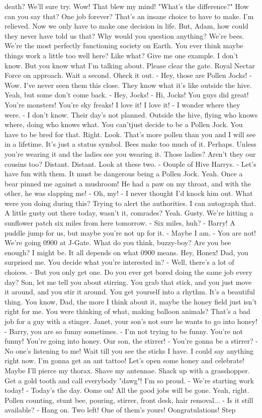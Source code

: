 \documentclass{article}
\begin{document}
death? We'll sure try. Wow! That blew my mind! "What's the difference?" How can you say that? One job forever? That's an insane choice to have to make. I'm relieved. Now we only have to make one decision in life. But, Adam, how could they never have told us that? Why would you question anything? We're bees. We're the most perfectly functioning society on Earth. You ever think maybe things work a little too well here? Like what? Give me one example. I don't know. But you know what I'm talking about. Please clear the gate. Royal Nectar Force on approach. Wait a second. Oheck it out. - Hey, those are Pollen Jocks! - Wow. I've never seen them this close. They know what it's like outside the hive. Yeah, but some don't come back. - Hey, Jocks! - Hi, Jocks! You guys did great! You're monsters! You're sky freaks! I love it! I love it! - I wonder where they were. - I don't know. Their day's not planned. Outside the hive, flying who knows where, doing who knows what. You can'tjust decide to be a Pollen Jock. You have to be bred for that. Right. Look. That's more pollen than you and I will see in a lifetime. It's just a status symbol. Bees make too much of it. Perhaps. Unless you're wearing it and the ladies see you wearing it. Those ladies? Aren't they our cousins too? Distant. Distant. Look at these two. - Oouple of Hive Harrys. - Let's have fun with them. It must be dangerous being a Pollen Jock. Yeah. Once a bear pinned me against a mushroom! He had a paw on my throat, and with the other, he was slapping me! - Oh, my! - I never thought I'd knock him out. What were you doing during this? Trying to alert the authorities. I can autograph that. A little gusty out there today, wasn't it, comrades? Yeah. Gusty. We're hitting a sunflower patch six miles from here tomorrow. - Six miles, huh? - Barry! A puddle jump for us, but maybe you're not up for it. - Maybe I am. - You are not! We're going 0900 at J-Gate. What do you think, buzzy-boy? Are you bee enough? I might be. It all depends on what 0900 means. Hey, Honex! Dad, you surprised me. You decide what you're interested in? - Well, there's a lot of choices. - But you only get one. Do you ever get bored doing the same job every day? Son, let me tell you about stirring. You grab that stick, and you just move it around, and you stir it around. You get yourself into a rhythm. It's a beautiful thing. You know, Dad, the more I think about it, maybe the honey field just isn't right for me. You were thinking of what, making balloon animals? That's a bad job for a guy with a stinger. Janet, your son's not sure he wants to go into honey! - Barry, you are so funny sometimes. - I'm not trying to be funny. You're not funny! You're going into honey. Our son, the stirrer! - You're gonna be a stirrer? - No one's listening to me! Wait till you see the sticks I have. I could say anything right now. I'm gonna get an ant tattoo! Let's open some honey and celebrate! Maybe I'll pierce my thorax. Shave my antennae. Shack up with a grasshopper. Get a gold tooth and call everybody "dawg"! I'm so proud. - We're starting work today! - Today's the day. Oome on! All the good jobs will be gone. Yeah, right. Pollen counting, stunt bee, pouring, stirrer, front desk, hair removal... - Is it still available? - Hang on. Two left! One of them's yours! Oongratulations! Step 
\end{document}
